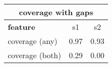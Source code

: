 \documentclass{standalone}
\begin{document}
\begin{tabular}{|l|c|c|}
\hline
\multicolumn{3}{|c|}{\textbf{coverage with gaps}}\\
\hline 

\textbf{feature} & s1 & s2 \\
\hline
coverage (any) & 0.97 & 0.93 \\
coverage (both) & 0.29 & 0.00 \\
\hline
\end{tabular}
\end{document}
